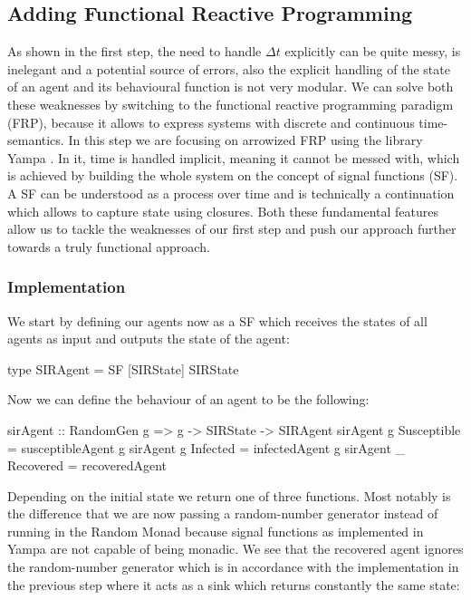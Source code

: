 \subsection{Adding Functional Reactive Programming}
\label{sec:step2_frp}
As shown in the first step, the need to handle $\Delta t$ explicitly can be quite messy, is inelegant and a potential source of errors, also the explicit handling of the state of an agent and its behavioural function is not very modular. We can solve both these weaknesses by switching to the functional reactive programming paradigm (FRP), because it allows to express systems with discrete and continuous time-semantics. In this step we are focusing on arrowized \cite{hughes_generalising_2000} FRP using the library Yampa \cite{hudak_arrows_2003}. In it, time is handled implicit, meaning it cannot be messed with, which is achieved by building the  whole system on the concept of signal functions (SF). A SF can be understood as a process over time and is technically a continuation which allows to capture state using closures. Both these fundamental features allow us to tackle the weaknesses of our first step and push our approach further towards a truly functional approach.

\subsubsection{Implementation}
We start by defining our agents now as a SF which receives the states of all agents as input and outputs the state of the agent:

\begin{HaskellCode}
type SIRAgent = SF [SIRState] SIRState 
\end{HaskellCode}

Now we can define the behaviour of an agent to be the following:

\begin{HaskellCode}
sirAgent :: RandomGen g => g -> SIRState -> SIRAgent
sirAgent g Susceptible = susceptibleAgent g
sirAgent g Infected    = infectedAgent g
sirAgent _ Recovered   = recoveredAgent
\end{HaskellCode}

Depending on the initial state we return one of three functions. Most notably is the difference that we are now passing a random-number generator instead of running in the Random Monad because signal functions as implemented in Yampa are not capable of being monadic. We see that the recovered agent ignores the random-number generator which is in accordance with the implementation in the previous step where it acts as a sink which returns constantly the same state:

